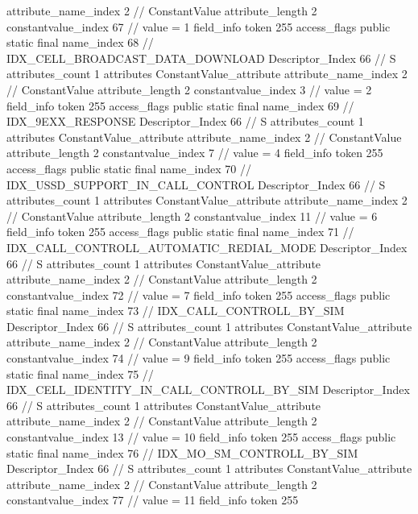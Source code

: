 {{{{{{{					attribute_name_index	2		// ConstantValue
					attribute_length	2
					constantvalue_index	67		// value = 1
				}
				}
			}
			field_info {
				token	255
				access_flags	public static final
				name_index	68		// IDX_CELL_BROADCAST_DATA_DOWNLOAD
				Descriptor_Index	66		// S
				attributes_count	1
				attributes {
				ConstantValue_attribute {
					attribute_name_index	2		// ConstantValue
					attribute_length	2
					constantvalue_index	3		// value = 2
				}
				}
			}
			field_info {
				token	255
				access_flags	public static final
				name_index	69		// IDX_9EXX_RESPONSE
				Descriptor_Index	66		// S
				attributes_count	1
				attributes {
				ConstantValue_attribute {
					attribute_name_index	2		// ConstantValue
					attribute_length	2
					constantvalue_index	7		// value = 4
				}
				}
			}
			field_info {
				token	255
				access_flags	public static final
				name_index	70		// IDX_USSD_SUPPORT_IN_CALL_CONTROL
				Descriptor_Index	66		// S
				attributes_count	1
				attributes {
				ConstantValue_attribute {
					attribute_name_index	2		// ConstantValue
					attribute_length	2
					constantvalue_index	11		// value = 6
				}
				}
			}
			field_info {
				token	255
				access_flags	public static final
				name_index	71		// IDX_CALL_CONTROLL_AUTOMATIC_REDIAL_MODE
				Descriptor_Index	66		// S
				attributes_count	1
				attributes {
				ConstantValue_attribute {
					attribute_name_index	2		// ConstantValue
					attribute_length	2
					constantvalue_index	72		// value = 7
				}
				}
			}
			field_info {
				token	255
				access_flags	public static final
				name_index	73		// IDX_CALL_CONTROLL_BY_SIM
				Descriptor_Index	66		// S
				attributes_count	1
				attributes {
				ConstantValue_attribute {
					attribute_name_index	2		// ConstantValue
					attribute_length	2
					constantvalue_index	74		// value = 9
				}
				}
			}
			field_info {
				token	255
				access_flags	public static final
				name_index	75		// IDX_CELL_IDENTITY_IN_CALL_CONTROLL_BY_SIM
				Descriptor_Index	66		// S
				attributes_count	1
				attributes {
				ConstantValue_attribute {
					attribute_name_index	2		// ConstantValue
					attribute_length	2
					constantvalue_index	13		// value = 10
				}
				}
			}
			field_info {
				token	255
				access_flags	public static final
				name_index	76		// IDX_MO_SM_CONTROLL_BY_SIM
				Descriptor_Index	66		// S
				attributes_count	1
				attributes {
				ConstantValue_attribute {
					attribute_name_index	2		// ConstantValue
					attribute_length	2
					constantvalue_index	77		// value = 11
				}
				}
			}
			field_info {
				token	255
}}}}}
